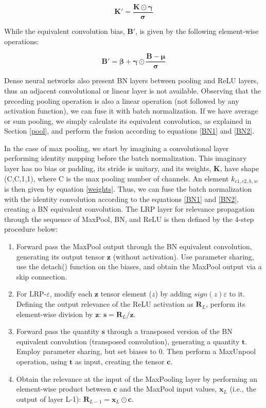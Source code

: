 \documentclass[fleqn,10pt]{wlscirep}
\begin{document}
{\begin{equation}
\label{BN1}
\bm{K'}=\frac{\bm{K} \odot \bm{\gamma}}{\bm{\sigma}}
\end{equation}

While the equivalent convolution bias, $\bm{B'}$, is given by the following element-wise operations:

\begin{equation}
\label{BN2}
\bm{B'}=\bm{\beta}+\bm{\gamma} \odot \frac{\bm{B}-\bm{\mu}}{\bm{\sigma}}
\end{equation}

Dense neural networks also present BN layers between pooling and ReLU layers, thus an adjacent convolutional or linear layer is not available. Observing that the preceding pooling operation is also a linear operation (not followed by any activation function), we can fuse it with batch normalization. If we have average or sum pooling, we simply calculate its equivalent convolution, as explained in Section \ref{pool}, and perform the fusion according to equations \ref{BN1} and \ref{BN2}. 

In the case of max pooling, we start by imagining a convolutional layer performing identity mapping before the batch normalization. This imaginary layer has no bias or padding, its stride is unitary, and its weights, $\bm{K}$, have shape (C,C,1,1), where C is the max pooling number of channels. An element $k_{c1,c2,h,w}$ is then given by equation \ref{weights}. Thus, we can fuse the batch normalization with the identity convolution according to the equations \ref{BN1} and \ref{BN2}, creating a BN equivalent convolution. The LRP layer for relevance propagation through the sequence of MaxPool, BN, and ReLU is then defined by the 4-step procedure below:

\begin{enumerate}
    \item Forward pass the MaxPool output through the BN equivalent convolution, generating its output tensor $\bm{z}$ (without activation). Use parameter sharing, use the detach() function on the biases, and obtain the MaxPool output via a skip connection.
    \item For LRP-$\varepsilon$, modify each $\bm{z}$ tensor element ($z$) by adding $sign(z)\varepsilon$ to it. Defining the output relevance of the ReLU activation as $\bm{R}_{L}$, perform its element-wise division by $\bm{z}$: $\bm{s}=\bm{R}_{L}/\bm{z}$. 
    \item Forward pass the quantity $\bm{s}$ through a transposed version of the BN equivalent convolution (transposed convolution), generating a quantity $\bm{t}$. Employ parameter sharing, but set biases to 0. Then perform a MaxUnpool operation, using $\bm{t}$ as input, creating the tensor $\bm{c}$. 
    \item Obtain the relevance at the input of the MaxPooling layer by performing an element-wise product between $\bm{c}$ and the MaxPool input values, $\bm{x}_{L}$ (i.e., the output of layer L-1): $\bm{R}_{L-1}=\bm{x}_{L} \odot \bm{c}$.
\end{enumerate}

}
\end{document}
